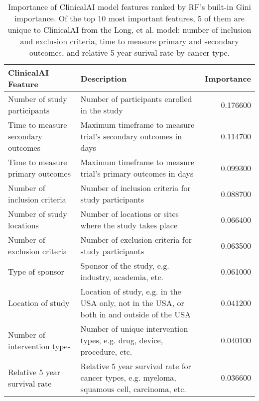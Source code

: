 \begin{table}
\caption{Importance of ClinicalAI model features ranked by RF's built-in Gini importance. Of the top 10 most important features, 5 of them are unique to ClinicalAI from the Long, et al. model: number of inclusion and exclusion criteria, time to measure primary and secondary outcomes, and relative 5 year surival rate by cancer type.}
\label{tab:feature_importance}
\begin{tabular}{llr}
\toprule
ClinicalAI Feature & Description & Importance \\
\midrule
Number of study participants & Number of participants enrolled in the study & 0.176600 \\
Time to measure secondary outcomes & Maximum timeframe to measure trial's secondary outcomes in days & 0.114700 \\
Time to measure primary outcomes & Maximum timeframe to measure trial's primary outcomes in days & 0.099300 \\
Number of inclusion criteria & Number of inclusion criteria for study participants & 0.088700 \\
Number of study locations & Number of locations or sites where the study takes place & 0.066400 \\
Number of exclusion criteria & Number of exclusion criteria for study participants & 0.063500 \\
Type of sponsor & Sponsor of the study, e.g. industry, academia, etc. & 0.061000 \\
Location of study & Location of study, e.g. in the USA only, not in the USA, or both in and outside of the USA & 0.041200 \\
Number of intervention types & Number of unique intervention types, e.g. drug, device, procedure, etc. & 0.040100 \\
Relative 5 year survival rate & Relative 5 year survival rate for cancer types, e.g. myeloma, squamous cell, carcinoma, etc. & 0.036600 \\
\bottomrule
\end{tabular}
\end{table}
